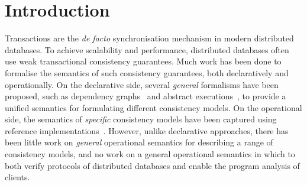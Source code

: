 \section{Introduction}
Transactions are the \emph{de facto} synchronisation mechanism in modern distributed databases.
To achieve scalability and performance, distributed databases  
often use weak transactional consistency guarantees. 
Much work has been done to formalise the semantics of such consistency guarantees, both
declaratively and operationally.
On the declarative side, several \emph{general} formalisms have been proposed, 
such as dependency graphs~\cite{adya} and abstract executions~\cite{ev_transactions}, to provide a unified
semantics for formulating different consistency models.  
On the operational side, the semantics of \emph{specific} consistency models have
been captured using reference implementations~\cite{si,PSI,PSI-RA}. 
However, unlike declarative approaches, there has been
little work on \emph{general} operational semantics for describing a range
of consistency models, and no work on a general operational semantics
in which to both verify protocols of distributed databases and 
enable the program analysis of clients.

